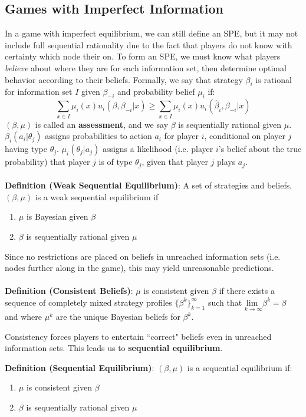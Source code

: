\documentclass{article}
\begin{document}
\subsection{Games with Imperfect Information}
In a game with imperfect equilibrium, we can still define an SPE, but it may not include full sequential rationality due to the fact that players do not know with certainty which node their on. To form an SPE, we must know what players \textit{believe} about where they are for each information set, then determine optimal behavior according to their beliefs. Formally, we say that strategy $\beta_i$ is rational for information set $I$ given $\beta_{-i}$ and probability belief $\mu_i$ if:
\[
	\sum_{x\in I}\mu_i(x)u_i(\beta,\beta_{-i}|x)\geq\sum_{x\in I}\mu_i(x)u_i(\hat{\beta}_i,\beta_{-i}|x)
\]
$(\beta,\mu)$ is called an \textbf{assessment}, and we say $\beta$ is sequentially rational given $\mu$. $\beta_i(a_i|\theta_j)$ assigns probabilities to action $a_i$ for player $i$, conditional on player $j$ having type $\theta_j$. $\mu_i(\theta_j|a_j)$ assigns a likelihood (i.e. player $i$'s belief about the true probability) that player $j$ is of type $\theta_j$, given that player $j$ plays $a_j$. \\
\\
\textbf{Definition (Weak Sequential Equilibrium)}: A set of strategies and beliefs, $(\beta,\mu)$ is a weak sequential equilibrium if
	\begin{enumerate}
		\item $\mu$ is Bayesian given $\beta$ 
		\item $\beta$ is sequentially rational given $\mu$ 
	\end{enumerate}
	Since no restrictions are placed on beliefs in unreached information sets (i.e. nodes further along in the game), this may yield unreasonable predictions. \\
	\\
\textbf{Definition (Consistent Beliefs)}: $\mu$ is consistent given $\beta$ if there exists a sequence of completely mixed strategy profiles $\{\beta^k\}_{k=1}^\infty$ such that ${\underset{k\rightarrow\infty}{\text{lim }}\beta^k=\beta}$ and where $\mu^k$ are the unique Bayesian beliefs for $\beta^k$.

Consistency forces players to entertain ``correct" beliefs even in unreached information sets. This leads us to \textbf{sequential equilibrium}.

\textbf{Definition (Sequential Equilibrium)}: $(\beta,\mu)$ is a sequential equilibrium if:
	\begin{enumerate}
		\item $\mu$ is consistent given $\beta$
		\item $\beta$ is sequentially rational given $\mu$
	\end{enumerate}
\end{document}
